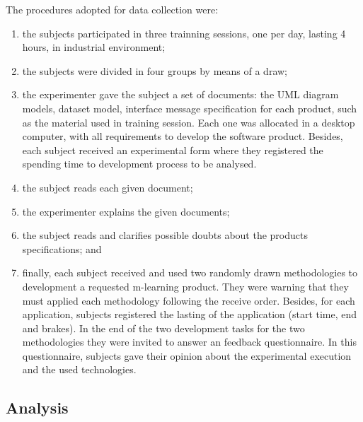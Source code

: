 The procedures adopted for data collection were:

\begin{enumerate}

\item the subjects participated in three trainning sessions, one per day, lasting 4 hours, in industrial environment;
\item the subjects were divided in four groups by means of a draw;
\item the experimenter gave the subject a set of documents: the UML diagram models, dataset model, interface message specification for each product, such as the material used in training session. Each one was allocated in a desktop computer, with all requirements to develop the software product. Besides, each subject received an experimental form where they registered the spending time to development process to be analysed.
\item the subject reads each given document;
\item the experimenter explains the given documents;
\item the subject reads and clarifies possible doubts about the products specifications; and
\item finally, each subject received and used two randomly drawn methodologies to development a requested m-learning product. They were warning that they must applied each methodology following the receive order. Besides, for each application, subjects registered the lasting of the application (start time, end and brakes). In the end of the two development tasks for the two methodologies they were invited to answer an feedback questionnaire. In this questionnaire, subjects gave their opinion about the experimental execution and the used technologies.
\end{enumerate}









\subsection{Analysis}\label{sub:analysis}

